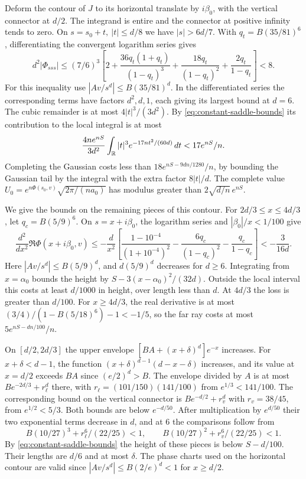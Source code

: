 Deform the contour of \(J\) to its horizontal translate
by \(i\beta_0\), with the vertical connector at \(d/2\).
The integrand is entire and the connector at positive
infinity tends to zero. On \(s=s_0+t,\ |t|\le d/8\)
we have \(|s|>6d/7\). With \(q_t=B(35/81)^6\),
differentiating the convergent logarithm series gives
\[
 d^2|\Phi_{sss}|
 \le (7/6)^3\left[2+
 \frac{36q_t(1+q_t)}{(1-q_t)^3}
 +\frac{18q_t}{(1-q_t)^2}+\frac{2q_t}{1-q_t}\right]<8.
\]
For this inequality use
\(|Av/s^d|\le B(35/81)^d\).
In the differentiated series the corresponding terms have
factors \(d^2,d,1\), each giving its largest bound at \(d=6\).
The cubic remainder is at most \(4|t|^3/(3d^2)\).
By \eqref{eq:constant-saddle-bounds} its contribution to the local integral is at most
\[
 \frac{4ne^{nS}}{3d^2}\int_{\mathbb R}|t|^3 e^{-17nt^2/(60d)}\,dt
 <17e^{nS}/n.
\]
Completing the Gaussian costs less than
\(18e^{nS-9dn/1280}/n\), by bounding the Gaussian tail by
the integral with the extra factor \(8|t|/d\).
The complete value
\(U_0=e^{n\Phi(s_0,v)}\sqrt{2\pi/(na_0)}\)
has modulus greater than \(2\sqrt{d/n}\,e^{nS}\).

We give the bounds on the remaining pieces of this contour.
For \(2d/3\le x\le4d/3\), let \(q_c=B(5/9)^6\).
On \(s=x+i\beta_0\), the logarithm series and
\(|\beta_0|/x<1/100\) give
\[
 \frac{d^2}{dx^2}\Re\Phi(x+i\beta_0,v)
 \le-\frac d{x^2}\left[
 \frac{1-10^{-4}}{(1+10^{-4})^2}
 -\frac{6q_c}{(1-q_c)^2}-\frac{q_c}{1-q_c}\right]
 <-\frac3{16d}.
\]
Here \(|Av/s^d|\le B(5/9)^d\), and \(d(5/9)^d\) decreases
for \(d\ge6\). Integrating from \(x=\alpha_0\) bounds the
height by \(S-3(x-\alpha_0)^2/(32d)\).
Outside the local interval this costs at least \(d/1000\)
in height, over length less than \(d\).
At \(4d/3\) the loss is greater than \(d/100\).
For \(x\ge4d/3\), the real derivative is at most
\((3/4)/(1-B(5/18)^6)-1<-1/5\), so the far ray costs at
most \(5e^{nS-dn/100}/n\).

On \([d/2,2d/3]\) the upper envelope
\([BA+(x+\delta)^d]e^{-x}\) increases. For
\(x+\delta<d-1\), the function
\((x+\delta)^{d-1}(d-x-\delta)\) increases, and its value
at \(x=d/2\) exceeds \(BA\) since \((e/2)^d>B\).
The envelope divided by \(A\) is at most
\(B e^{-2d/3}+r_\ell^d\) there, with
\(r_\ell=(101/150)(141/100)\) from \(e^{1/3}<141/100\).
The corresponding bound on the vertical connector is
\(B e^{-d/2}+r_v^d\) with \(r_v=38/45\), from \(e^{1/2}<5/3\).
Both bounds are below \(e^{-d/50}\).
After multiplication by \(e^{d/50}\) their two exponential
terms decrease in \(d\), and at \(6\) the comparisons follow
from
\[
 B(10/27)^3+r_\ell^6/(22/25)<1,\qquad
 B(10/27)^2+r_v^6/(22/25)<1.
\]
By \eqref{eq:constant-saddle-bounds} the height of these pieces is below \(S-d/100\).
Their lengths are \(d/6\) and at most \(\delta\).
The phase charts used on the horizontal contour are valid
since \(|Av/s^d|\le B(2/e)^d<1\) for \(x\ge d/2\).

